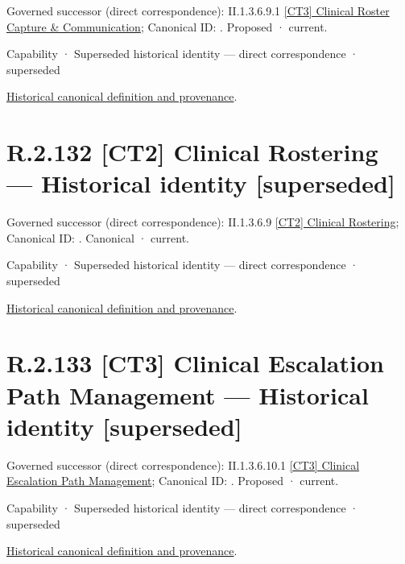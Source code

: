 {\small Governed successor (direct correspondence): II.1.3.6.9.1 \hyperref[element:8243cba81fb6449781d10823ae194237]{[CT3] Clinical Roster Capture \& Communication}; Canonical ID: \texttt{}. Proposed · current.}\par
\label{element:2054d57bb33a4361b3ef0824545a1784}
{\small Capability · Superseded historical identity — direct correspondence · superseded}\par
\href{../../../../../../../continuum/strategy/capability/2054d57bb33a4361b3ef0824545a1784.md}{Historical canonical definition and provenance}.\par
\section*{R.2.132 [CT2] Clinical Rostering — Historical identity [superseded]}
\label{navigation:R.2.132}

{\small Governed successor (direct correspondence): II.1.3.6.9 \hyperref[element:192ca88a289544dcbf6adaf643f39969]{[CT2] Clinical Rostering}; Canonical ID: \texttt{}. Canonical · current.}\par
\label{element:b6527516a69c499d8cc9c8fe881169fe}
{\small Capability · Superseded historical identity — direct correspondence · superseded}\par
\href{../../../../../../../continuum/strategy/capability/b6527516a69c499d8cc9c8fe881169fe.md}{Historical canonical definition and provenance}.\par
\section*{R.2.133 [CT3] Clinical Escalation Path Management — Historical identity [superseded]}
\label{navigation:R.2.133}

{\small Governed successor (direct correspondence): II.1.3.6.10.1 \hyperref[element:cca86a32ba8c4dda84caeaa248e9f444]{[CT3] Clinical Escalation Path Management}; Canonical ID: \texttt{}. Proposed · current.}\par
\label{element:759a2e52172345e8ad1bc96d7e5ddad3}
{\small Capability · Superseded historical identity — direct correspondence · superseded}\par
\href{../../../../../../../continuum/strategy/capability/759a2e52172345e8ad1bc96d7e5ddad3.md}{Historical canonical definition and provenance}.\par
